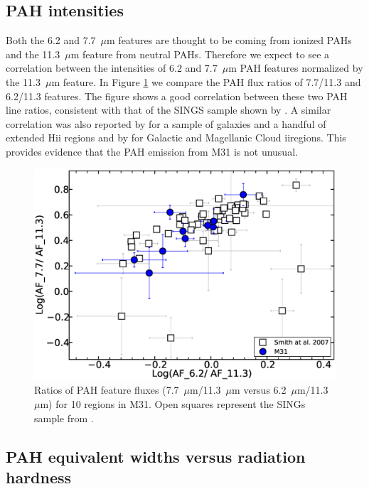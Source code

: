 \subsection{PAH intensities}
\label{sect:pah_ratios}

Both the 6.2 and 7.7~$\mu$m features are thought to be coming from ionized PAHs and the 11.3~$\mu$m feature from neutral PAHs. Therefore we expect to see a correlation between the intensities of 6.2 and 7.7~$\mu$m PAH features normalized by the 11.3~$\mu$m feature. In Figure \ref{PAHlines} we compare the PAH flux ratios of 7.7/11.3  and 6.2/11.3 features. The figure shows a good correlation between these two PAH line ratios, consistent with that of the SINGS sample shown by \citet{Smith:2007lr}.
A similar correlation was also reported by  \citet{Galliano2008} for a sample of galaxies and a handful of extended H{\sc ii} regions
and by \citet{Vermeij2002} for Galactic and Magellanic Cloud {\sc ii}regions. This provides evidence that the PAH emission from M31 is not unusual. 

\begin{figure}
\centering
\includegraphics[scale = 0.25]{./SINGSnMy.eps}
\caption{Ratios of PAH feature fluxes (7.7~$\mu$m/11.3~$\mu$m versus 6.2~$\mu$m/11.3~$\mu$m) for 10 regions in M31.
Open squares represent the SINGs sample from \citet{Smith:2007lr}.
}
\label{PAHlines}
\end{figure}

\subsection{PAH equivalent widths versus radiation hardness}
\label{sect:eqw_rh}


